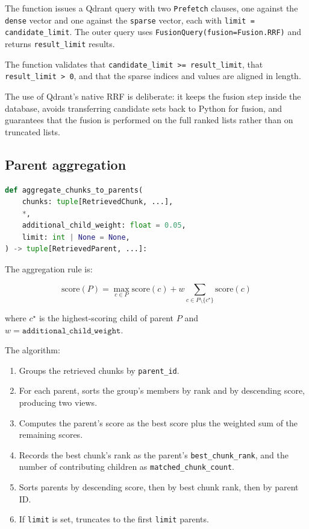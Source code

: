 \documentclass[11pt,a4paper]{article}
\begin{document}
The function issues a Qdrant query with two \texttt{Prefetch}
clauses, one against the \texttt{dense} vector and one against the
\texttt{sparse} vector, each with \texttt{limit = candidate\_limit}.
The outer query uses \texttt{FusionQuery(fusion=Fusion.RRF)} and
returns \texttt{result\_limit} results.

The function validates that \texttt{candidate\_limit >= result\_limit},
that \texttt{result\_limit > 0}, and that the sparse indices and
values are aligned in length.

The use of Qdrant's native RRF is deliberate: it keeps the fusion
step inside the database, avoids transferring candidate sets back to
Python for fusion, and guarantees that the fusion is performed on the
full ranked lists rather than on truncated lists.

\subsection{Parent aggregation}
\begin{lstlisting}[language=python]
def aggregate_chunks_to_parents(
    chunks: tuple[RetrievedChunk, ...],
    *,
    additional_child_weight: float = 0.05,
    limit: int | None = None,
) -> tuple[RetrievedParent, ...]:
\end{lstlisting}

The aggregation rule is:

\[
\mathrm{score}(P) = \max_{c \in P} \mathrm{score}(c)
  + w \sum_{c \in P \setminus \{c^\star\}} \mathrm{score}(c)
\]

where $c^\star$ is the highest-scoring child of parent $P$ and
$w = \texttt{additional\_child\_weight}$.

The algorithm:

\begin{enumerate}[leftmargin=1.5em,itemsep=0.15em]
  \item Groups the retrieved chunks by \texttt{parent\_id}.
  \item For each parent, sorts the group's members by rank and by
    descending score, producing two views.
  \item Computes the parent's score as the best score plus the
    weighted sum of the remaining scores.
  \item Records the best chunk's rank as the parent's
    \texttt{best\_chunk\_rank}, and the number of contributing
    children as \texttt{matched\_chunk\_count}.
  \item Sorts parents by descending score, then by best chunk rank,
    then by parent ID.
  \item If \texttt{limit} is set, truncates to the first \texttt{limit}
    parents.
\end{enumerate}
\end{document}

